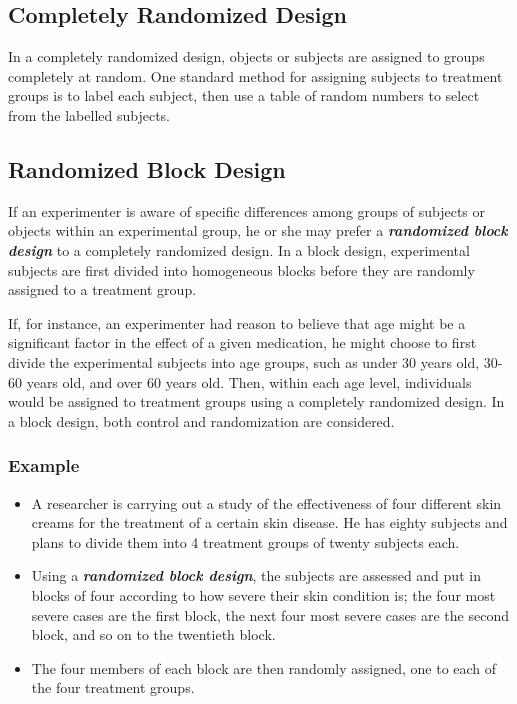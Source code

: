 \documentclass[12pt]{article}
\begin{document}
\subsection*{Completely Randomized Design}

In a completely randomized design, objects or subjects are assigned to groups completely at random. One standard method for assigning subjects to treatment groups is to label each subject, then use a table of random numbers to select from the labelled subjects.

\subsection*{Randomized Block Design}

If an experimenter is aware of specific differences among groups of subjects or objects within an experimental group, he or she may prefer a \textit{\textbf{randomized block design}} to a completely randomized design. In a block design, experimental subjects are first divided into homogeneous blocks before they are randomly assigned to a treatment group. 

If, for instance, an experimenter had reason to believe that age might be a significant factor in the effect of a given medication, he might choose to first divide the experimental subjects into age groups, such as under 30 years old, 30-60 years old, and over 60 years old. Then, within each age level, individuals would be assigned to treatment groups using a completely randomized design. In a block design, both control and randomization are considered.

\subsubsection*{Example}
\begin{itemize}
\item A researcher is carrying out a study of the effectiveness of four different skin creams for the treatment of a certain skin disease. He has eighty subjects and plans to divide them into 4 treatment groups of twenty subjects each. 
\item Using a \textit{\textbf{randomized block design}}, the subjects are assessed and put in blocks of four according to how severe their skin condition is; the four most severe cases are the first block, the next four most severe cases are the second block, and so on to the twentieth block. 
\item The four members of each block are then randomly assigned, one to each of the four treatment groups. 
\end{itemize}
\end{document}
